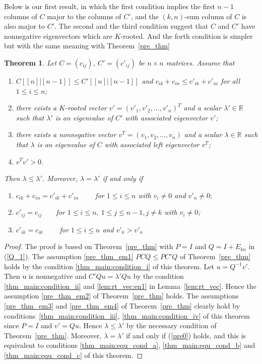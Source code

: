 \documentclass[12pt, a4paper]{article}
\theoremstyle{plain}
\newtheorem{thm}{Theorem}[section]
\theoremstyle{definition}
\begin{document}
Below is our first result, in which the first condition implies the first $n-1$ columns of $C$ major to
 the columns of $C'$, and the $(k,n)$-sum column of $C$ is also major to $C'$. The second and the third condition
 suggest that $C$ and $C'$ have nonnegative eigenvectors which are $K$-rooted. And the forth condition is simpler
  but with the same meaning with Theorem~\ref{pre_thm}
\begin{thm}\label{thm_main}
    Let $C=(c_{ij})$, $C'=(c'_{ij})$ be  $n\times n$ matrices.
Assume that
\begin{enumerate}[label=(\roman*)]
\item \label{thm_main:condition_i} $C[[n]|[n-1]]\leq C'[[n]|[n-1]]$ and $c_{ik}+c_{in}\leq c'_{ik}+c'_{in}$ for all $1\leq i\leq n$;
\item \label{thm_main:condition_ii} there exists a $K$-rooted vector $v'=(v'_1, v'_2, \ldots, v'_n)^T$ and a scalar
 $\lambda'\in \mathbb{R}$ such that $\lambda'$ is an eigenvalue of $C'$ with associated eigenvector $v'$;
\item \label{thm_main:condition_iii}there exists a nonnegative vector $v^T=(v_1, v_2, \ldots, v_n)$ and a scalar
 $\lambda\in \mathbb{R}$ such that $\lambda$ is an eigenvalue of $C$ with associated left eigenvector $v^T$;
\item \label{thm_main:condition_iv}$v^Tv'>0.$
\end{enumerate}
 Then $\lambda\leq \lambda'$.
Moreover, $\lambda=\lambda'$
if and only if
\begin{enumerate}[label=(\alph*)]
    \item \label{thm_main:equ_cond_a} $c_{ik}+c_{in}=c'_{ik}+c'_{in} \qquad$  for $1\leq i\leq n$ with $v_i\not=0$ and $v'_n\not=0;$
    \item \label{thm_main:equ_cond_b} $c'_{ij}=c_{ij}\qquad $for $1\leq i\leq n,~1\leq j\leq n-1, j \neq k $ with $v_i\ne 0 $;
    \item \label{thm_main:equ_cond_c} $c'_{ik}=c_{ik} \qquad $  for $1\leq i \leq n$ and $ v'_{k}>v'_n$
\end{enumerate} %
\end{thm}
%


\begin{proof}
    The proof is based on Theorem~\ref{pre_thm} with $P = I$ and $Q = I + E_{kn}$ in (\ref{Q_1}).
    The assumption \ref{pre_thm_em1} $PCQ\leq PC'Q$ of Theorem~\ref{pre_thm} holds by the condition \ref{thm_main:condition_i} of this theorem.
    Let $u = Q^{-1}v'$. Then u is nonnegative and $C'Qu = \lambda' Qu$ by the condition \ref{thm_main:condition_ii} and \ref{lem:rt_vec:en1} in
     Lemma~\ref{lem:rt_vec}. Hence the assumption \ref{pre_thm_em2} of Theorem~\ref{pre_thm} holds. The assumptions \ref{pre_thm_em3} and \ref{pre_thm_em4}
      of Theorem~\ref{pre_thm} clearly hold by conditions~\ref{thm_main:condition_iii}, \ref{thm_main:condition_iv} of this theorem since $P = I$ and
       $v'= Qu$. Hence $\lambda \leq \lambda' $ by the necessary condition of Theorem~\ref{pre_thm}. Moreover,
        $\lambda = \lambda'$ if and only if (\ref{pre0}) holds, and this is equivalent to
         conditions \ref{thm_main:equ_cond_a}, \ref{thm_main:equ_cond_b} and \ref{thm_main:equ_cond_c} of this theorem.
\end{proof}
\end{document}
